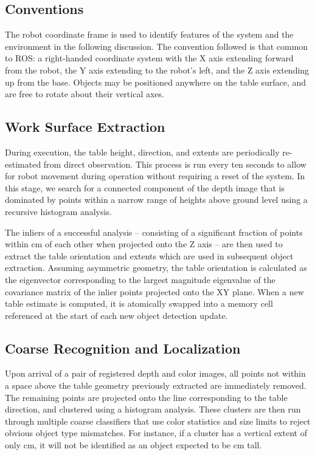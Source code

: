 \documentclass[letterpaper, 10 pt, conference]{ieeeconf}  %
\begin{document}
\subsection{Conventions}
The robot coordinate frame is used to identify features of the system
and the environment in the following discussion. The convention
followed is that common to ROS: a right-handed coordinate system with
the X axis extending forward from the robot, the Y axis extending to
the robot's left, and the Z axis extending up from the base. Objects
may be positioned anywhere on the table surface, and are free to
rotate about their vertical axes.

\subsection{Work Surface Extraction}
\label{sec:table-detection}
During execution, the table height, direction, and extents are
periodically re-estimated from direct observation. This process is run
every ten seconds to allow for robot movement during operation without
requiring a reset of the system. In this stage, we search for a
connected component of the depth image that is dominated by points
within a narrow range of heights above ground level using a recursive
histogram analysis.

The inliers of a successful analysis -- consisting of a significant
fraction of points within \unit[2]{cm} of each other when projected
onto the Z axis -- are then used to extract the table orientation and
extents which are used in subsequent object extraction. Assuming
asymmetric geometry, the table orientation is calculated as the
eigenvector corresponding to the largest magnitude eigenvalue of the
covariance matrix of the inlier points projected onto the XY
plane. When a new table estimate is computed, it is atomically swapped
into a memory cell referenced at the start of each new object
detection update.

\subsection{Coarse Recognition and Localization}
Upon arrival of a pair of registered depth and color images, all
points not within a space above the table geometry previously
extracted are immediately removed. The remaining points are projected
onto the line corresponding to the table direction, and clustered
using a histogram analysis. These clusters are then run through
multiple coarse classifiers that use color statistics and size limits
to reject obvious object type mismatches. For instance, if a cluster
has a vertical extent of only \unit[10]{cm}, it will not be identified
as an object expected to be \unit[30]{cm} tall.
\end{document}

